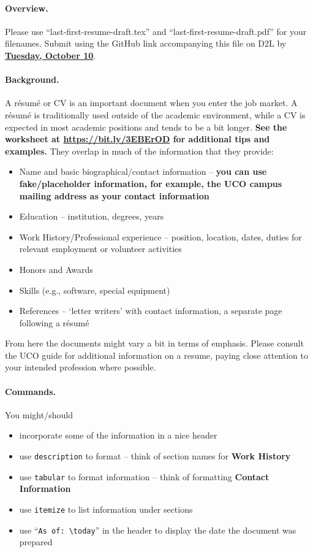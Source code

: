 \documentclass[11pt]{article}
\newcommand{\compactlist}{\setlength{\itemsep}{0pt} \setlength{\parskip}{0pt} \setlength{\leftskip}{-1em}}
\begin{document}
\paragraph{Overview.} Please use ``last-first-resume-draft.tex'' and ``last-first-resume-draft.pdf'' for your filenames.  Submit using the GitHub link accompanying this file on D2L by \textbf{\underline{{Tuesday, October 10}}}.

\paragraph{Background.} A r\'esum\'e or CV is an important document when you enter the job market.  A r\'esum\'e is traditionally used outside of the academic environment, while a CV is expected in most academic positions and tends to be a bit longer.  \textbf{See the worksheet at \url{https://bit.ly/3EBErOD} for additional tips and examples.} They overlap in much of the information that they provide:
%
\begin{itemize} \compactlist
\item Name and basic biographical\slash contact information -- \textbf{you can use fake/placeholder information, for example, the UCO campus mailing address as your contact information}
\item Education -- institution, degrees, years
\item Work History\slash Professional experience -- position, location, dates, duties for relevant employment or volunteer activities
\item Honors and Awards
\item Skills (e.g., software, special equipment)
\item References -- `letter writers' with contact information, a separate page following a r\'esum\'e
\end{itemize}
%
From here the documents might vary a bit in terms of emphasis.  Please consult the UCO guide for additional information on a resume, paying close attention to your intended profession where possible.

\paragraph{Commands.} You might\slash should 
\begin{itemize}\compactlist
\item incorporate some of the information in a nice header
\item use \verb|description| to format -- think of section names for \textbf{Work History}
\item use \verb|tabular| to format information -- think of formatting \textbf{Contact Information}
\item use \verb|itemize| to list information under sections
\item use ``\verb|As of: \today|'' in the header to display the date the document was prepared
\end{itemize}
\end{document}
